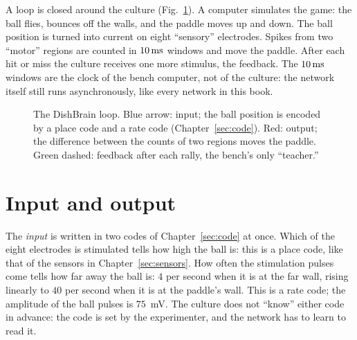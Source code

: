 A loop is closed around the culture (Fig.~\ref{fig:dishloop}). A computer simulates the game: the ball flies, bounces off the walls, and the paddle moves up and down. The ball position is turned into current on eight ``sensory'' electrodes. Spikes from two ``motor'' regions are counted in $10\,\text{ms}$ windows and move the paddle. After each hit or miss the culture receives one more stimulus, the feedback. The $10\,\text{ms}$ windows are the clock of the bench computer, not of the culture: the network itself still runs asynchronously, like every network in this book.

\begin{figure}[t]
\centering
{}
\caption{The DishBrain loop. Blue arrow: input; the ball position is encoded by a place code and a rate code (Chapter~\ref{sec:code}). Red: output; the difference between the counts of two regions moves the paddle. Green dashed: feedback after each rally, the bench's only ``teacher.''}
\label{fig:dishloop}
\end{figure}

\section{Input and output}

The \emph{input} is written in two codes of Chapter~\ref{sec:code} at once. Which of the eight electrodes is stimulated tells how high the ball is: this is a place code, like that of the sensors in Chapter~\ref{sec:sensors}. How often the stimulation pulses come tells how far away the ball is: $4$ per second when it is at the far wall, rising linearly to $40$ per second when it is at the paddle's wall. This is a rate code; the amplitude of the ball pulses is $75$~mV. The culture does not ``know'' either code in advance: the code is set by the experimenter, and the network has to learn to read it.

